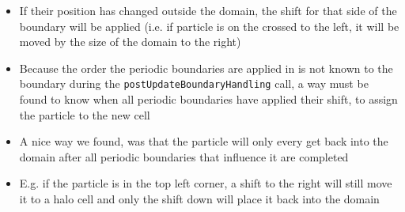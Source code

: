 \documentclass{article}
\begin{document}
\begin{itemize}
\begin{itemize}
        \item If their position has changed outside the domain, the shift for that side of the boundary will be applied (i.e. if particle is on the crossed to the left, it will be moved by the size of the domain to the right)
        \item Because the order the periodic boundaries are applied in is not known to the boundary during the \texttt{postUpdateBoundaryHandling} call, a way must be found to know when all periodic boundaries have applied their shift, to assign the particle to the new cell
        \item A nice way we found, was that the particle will only every get back into the domain after all periodic boundaries that influence it are completed
        \item E.g. if the particle is in the top left corner, a shift to the right will still move it to a halo cell and only the shift down will place it back into the domain
    \end{itemize}
\end{itemize}
\end{document}
